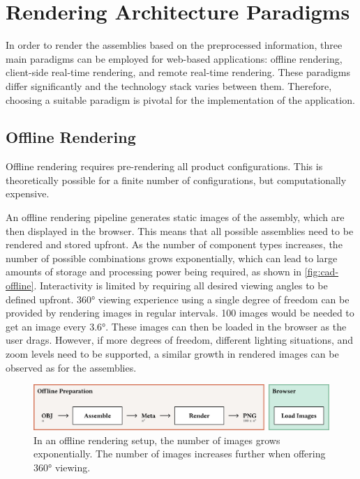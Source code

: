 \section{Rendering Architecture Paradigms}

In order to render the assemblies based on the preprocessed information, three main paradigms can be employed for web-based applications: offline rendering, client-side real-time rendering, and remote real-time rendering. These paradigms differ significantly and the technology stack varies between them. Therefore, choosing a suitable paradigm is pivotal for the implementation of the application.

\subsection*{Offline Rendering}

Offline rendering requires pre-rendering all product configurations. This is theoretically possible for a finite number of configurations, but computationally expensive.

An offline rendering pipeline generates static images of the assembly, which are then displayed in the browser. This means that all possible assemblies need to be rendered and stored upfront. As the number of component types increases, the number of possible combinations grows exponentially, which can lead to large amounts of storage and processing power being required, as shown in \autoref{fig:cad-offline}. Interactivity is limited by requiring all desired viewing angles to be defined upfront. 360° viewing experience using a single degree of freedom can be provided by rendering images in regular intervals. 100 images would be needed to get an image every 3.6°. These images can then be loaded in the browser as the user drags. However, if more degrees of freedom, different lighting situations, and zoom levels need to be supported, a similar growth in rendered images can be observed as for the assemblies.

\begin{figure}[H]
  \includegraphics[width=\columnwidth]{resources/cad-pipeline-offline.png}
  \caption{In an offline rendering setup, the number of images grows exponentially. The number of images increases further when offering 360° viewing.}
  \label{fig:cad-offline}
\end{figure}

